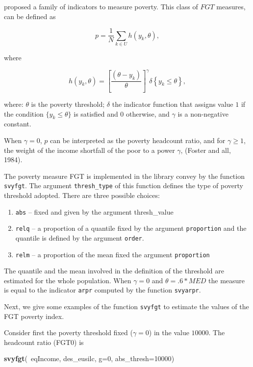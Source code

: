 \documentclass[]{book}
\newenvironment{Shaded}{\begin{snugshade}}{\end{snugshade}}
\newcommand{\KeywordTok}[1]{\textcolor[rgb]{0.13,0.29,0.53}{\textbf{{#1}}}}
\newcommand{\DataTypeTok}[1]{\textcolor[rgb]{0.13,0.29,0.53}{{#1}}}
\newcommand{\DecValTok}[1]{\textcolor[rgb]{0.00,0.00,0.81}{{#1}}}
\newcommand{\NormalTok}[1]{{#1}}
\providecommand{\tightlist}{%
  \setlength{\itemsep}{0pt}\setlength{\parskip}{0pt}}
\begin{document}
\citep{foster1984} proposed a family of indicators to measure poverty.
This class of \(FGT\) measures, can be defined as

\[
p=\frac{1}{N}\sum_{k\in U}h(y_{k},\theta ), 
\]

where

\[
h(y_{k},\theta )=\left[ \frac{(\theta -y_{k})}{\theta }\right] ^{\gamma
}\delta \left\{ y_{k}\leq \theta \right\} , 
\]

where: \(\theta\) is the poverty threshold; \(\delta\) the indicator
function that assigns value \(1\) if the condition
\(\{y_{k}\leq \theta \}\) is satisfied and \(0\) otherwise, and
\(\gamma\) is a non-negative constant.

When \(\gamma =0\), \(p\) can be interpreted as the poverty headcount
ratio, and for \(\gamma \geq 1\), the weight of the income shortfall of
the poor to a power \(\gamma\), (Foster and all, 1984).

The poverty measure FGT is implemented in the library convey by the
function \texttt{svyfgt}. The argument \texttt{thresh\_type} of this
function defines the type of poverty threshold adopted. There are three
possible choices:

\begin{enumerate}
\def\labelenumi{\arabic{enumi}.}
\tightlist
\item
  \texttt{abs} -- fixed and given by the argument thresh\_value
\item
  \texttt{relq} -- a proportion of a quantile fixed by the argument
  \texttt{proportion} and the quantile is defined by the argument
  \texttt{order}.
\item
  \texttt{relm} -- a proportion of the mean fixed the argument
  \texttt{proportion}
\end{enumerate}

The quantile and the mean involved in the definition of the threshold
are estimated for the whole population. When \(\gamma=0\) and
\(\theta= .6*MED\) the measure is equal to the indicator \texttt{arpr}
computed by the function \texttt{svyarpr}.

Next, we give some examples of the function \texttt{svyfgt} to estimate
the values of the FGT poverty index.

Consider first the poverty threshold fixed (\(\gamma=0\)) in the value
\(10000\). The headcount ratio (FGT0) is

\begin{Shaded}
\begin{Highlighting}[]
\KeywordTok{svyfgt}\NormalTok{(~eqIncome, des_eusilc, }\DataTypeTok{g=}\DecValTok{0}\NormalTok{, }\DataTypeTok{abs_thresh=}\DecValTok{10000}\NormalTok{)}
\end{Highlighting}
\end{Shaded}
\end{document}
